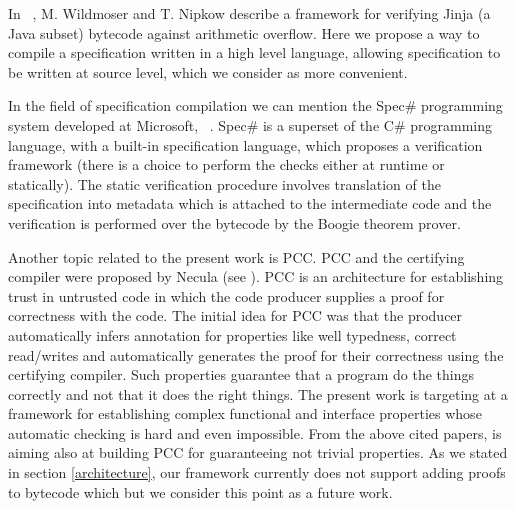 In ~\cite{WildmoserN-ESOP05}, M. Wildmoser and T. Nipkow describe a framework for verifying Jinja (a Java subset) bytecode against arithmetic overflow. 
Here we propose a way to compile a specification written in a high level language, allowing specification to be written at source level, which we consider as more convenient.

In the field of specification compilation we can mention the Spec\# programming system developed at Microsoft,
~\cite{BLS04sp}. Spec\# is a superset of the C\# programming language, with a built-in  specification language,
which proposes a verification framework (there is a choice to perform the checks either at runtime or statically). 
 The static verification procedure  involves translation of the specification into metadata which is attached to the intermediate code 
 and the verification is performed over the bytecode by the Boogie theorem prover.

Another topic related to the present work is PCC.
 PCC and the certifying compiler were proposed by Necula (see \cite{Necula97,ComNec,DesNecLee98}). PCC is an architecture for establishing trust in untrusted code 
in which the code producer supplies a proof for correctness with the code. 
The initial idea for PCC  was that the producer automatically infers annotation for properties like well typedness, 
correct read/writes and automatically generates the proof for their correctness using the certifying compiler. 
Such properties guarantee that a program do the things correctly and not that it does the right things. The present work is targeting at a
 framework for establishing complex functional and interface properties whose automatic checking is hard and even impossible. 
 From the above cited papers, \cite{BM05plb} is aiming also at building PCC for
 guaranteeing not trivial properties. As we stated in section \ref{architecture}, our framework currently does not support adding proofs to bytecode 
 which but we consider this point as a future work. 
 
